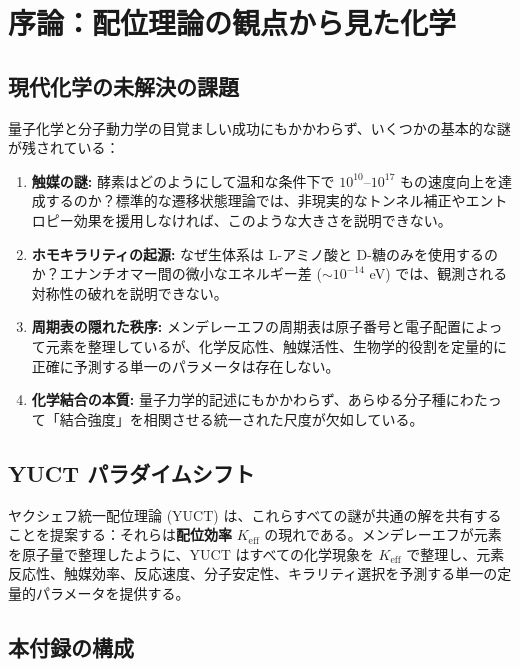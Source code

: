 \documentclass[11pt,a4paper]{article}
\newcommand{\Keff}{K_{\mathrm{eff}}}
\begin{document}
	\tableofcontents
	\newpage
	
	\section{序論：配位理論の観点から見た化学}
	\label{sec:intro}
	
	\subsection{現代化学の未解決の課題}
	
	量子化学と分子動力学の目覚ましい成功にもかかわらず、いくつかの基本的な謎が残されている：
	
	\begin{enumerate}
		\item \textbf{触媒の謎:} 酵素はどのようにして温和な条件下で $10^{10}$--$10^{17}$ もの速度向上を達成するのか？標準的な遷移状態理論では、非現実的なトンネル補正やエントロピー効果を援用しなければ、このような大きさを説明できない。
		\item \textbf{ホモキラリティの起源:} なぜ生体系は L-アミノ酸と D-糖のみを使用するのか？エナンチオマー間の微小なエネルギー差 ($\sim 10^{-14}$ eV) では、観測される対称性の破れを説明できない。
		\item \textbf{周期表の隠れた秩序:} メンデレーエフの周期表は原子番号と電子配置によって元素を整理しているが、化学反応性、触媒活性、生物学的役割を定量的に正確に予測する単一のパラメータは存在しない。
		\item \textbf{化学結合の本質:} 量子力学的記述にもかかわらず、あらゆる分子種にわたって「結合強度」を相関させる統一された尺度が欠如している。
	\end{enumerate}
	
	\subsection{YUCT パラダイムシフト}
	
	ヤクシェフ統一配位理論 (YUCT) は、これらすべての謎が共通の解を共有することを提案する：それらは\textbf{配位効率} $\Keff$ の現れである。メンデレーエフが元素を原子量で整理したように、YUCT はすべての化学現象を $\Keff$ で整理し、元素反応性、触媒効率、反応速度、分子安定性、キラリティ選択を予測する単一の定量的パラメータを提供する。
	
	\subsection{本付録の構成}
	
\end{document}
